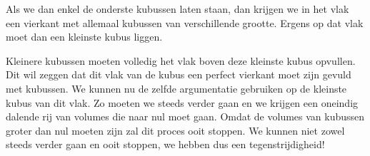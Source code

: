 
Als we dan enkel de onderste kubussen laten staan, dan krijgen we in het vlak een vierkant met allemaal kubussen van verschillende grootte. Ergens op dat vlak moet dan een kleinste kubus liggen.





Kleinere kubussen moeten volledig het vlak boven deze kleinste kubus opvullen. Dit wil zeggen dat dit vlak van de kubus een perfect vierkant moet zijn gevuld met kubussen. We kunnen nu de zelfde argumentatie gebruiken op de kleinste kubus van dit vlak. Zo moeten we steeds verder gaan en we krijgen een oneindig dalende rij van volumes die naar nul moet gaan. Omdat de volumes van kubussen groter dan nul moeten zijn zal dit proces ooit stoppen. We kunnen niet zowel steeds verder gaan en ooit stoppen, we hebben dus een tegenstrijdigheid!




